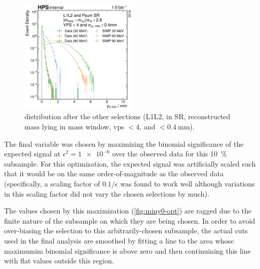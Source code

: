 \begin{figure}
  \centering
  \includegraphics[width=0.5\textwidth]{figures/hps/analysis/min-y0-after-others.pdf}
  \caption{%
    \minyzero distribution after the other selections (L1L2, \Psum in SR, reconstructed
    mass lying in mass window, \ac{vps} $< 4$, and \maxyzeroerr$< \qty{0.4}{\mm}$).
  }
  \label{fig:min-y0-after-others}
\end{figure}

The final variable \minyzero was chosen by maximizing the binomial significance
of the expected signal at $\epsilon^2=\num{1e-6}$ over the observed data for this \qty{10}{\%} subsample.
For this optimization, the expected signal was artificially scaled such that it would
be on the same order-of-magnitude as the observed data (specifically, a scaling factor
of $0.1/\epsilon$ was found to work well although variations in this scaling factor did not vary
the chosen selections by much).

The \minyzero values chosen by this maximization (\cref{fig:miny0-opt}) are ragged due to the finite
nature of the subsample on which they are being chosen.
In order to avoid over-biasing the selection to this arbitrarily-chosen subsample,
the actual cuts used in the final analysis are smoothed by fitting a line to the area
whose maximumim binomial significance is above zero and then continuining this line with flat
values outside this region.

